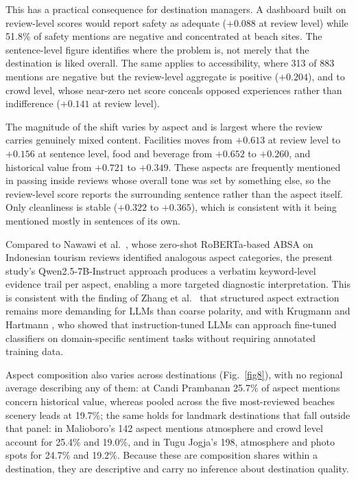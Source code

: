 \documentclass[pdflatex,sn-mathphys-num]{sn-jnl}
\begin{document}
This has a practical consequence for destination managers. A dashboard built on review-level scores would report safety as adequate ($+0.088$ at review level) while 51.8\% of safety mentions are negative and concentrated at beach sites. The sentence-level figure identifies where the problem is, not merely that the destination is liked overall. The same applies to accessibility, where 313 of 883 mentions are negative but the review-level aggregate is positive ($+0.204$), and to crowd level, whose near-zero net score conceals opposed experiences rather than indifference ($+0.141$ at review level).

The magnitude of the shift varies by aspect and is largest where the review carries genuinely mixed content. Facilities moves from $+0.613$ at review level to $+0.156$ at sentence level, food and beverage from $+0.652$ to $+0.260$, and historical value from $+0.721$ to $+0.349$. These aspects are frequently mentioned in passing inside reviews whose overall tone was set by something else, so the review-level score reports the surrounding sentence rather than the aspect itself. Only cleanliness is stable ($+0.322$ to $+0.365$), which is consistent with it being mentioned mostly in sentences of its own.

Compared to Nawawi et al.\ \cite{bib5}, whose zero-shot RoBERTa-based ABSA on Indonesian tourism reviews identified analogous aspect categories, the present study's Qwen2.5-7B-Instruct approach produces a verbatim keyword-level evidence trail per aspect, enabling a more targeted diagnostic interpretation. This is consistent with the finding of Zhang et al.\ \cite{bib19} that structured aspect extraction remains more demanding for LLMs than coarse polarity, and with Krugmann and Hartmann \cite{bib18}, who showed that instruction-tuned LLMs can approach fine-tuned classifiers on domain-specific sentiment tasks without requiring annotated training data.

Aspect composition also varies across destinations (Fig.~\ref{fig8}), with no regional average describing any of them: at Candi Prambanan 25.7\% of aspect mentions concern historical value, whereas pooled across the five most-reviewed beaches scenery leads at 19.7\%; the same holds for landmark destinations that fall outside that panel: in Malioboro's 142 aspect mentions atmosphere and crowd level account for 25.4\% and 19.0\%, and in Tugu Jogja's 198, atmosphere and photo spots for 24.7\% and 19.2\%. Because these are composition shares within a destination, they are descriptive and carry no inference about destination quality.
\end{document}
